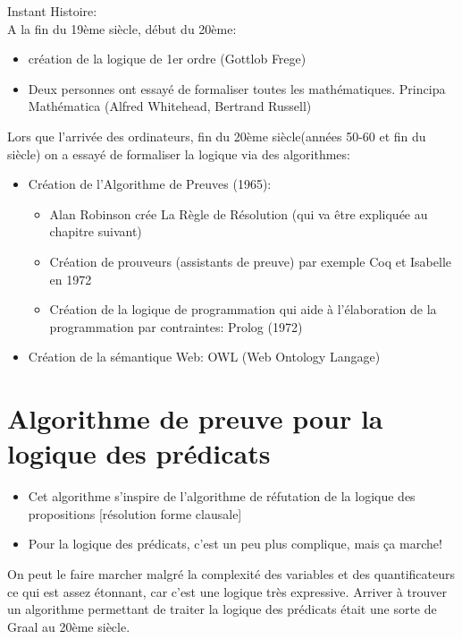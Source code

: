 \hfill {\begin{minipage}{0.90\textwidth}
\begin{small}
{\large Instant Histoire:}\\
A la fin du 19ème siècle, début du 20ème: 
\begin{itemize}
\item création de la logique de 1er ordre (Gottlob Frege)
\item Deux personnes ont essayé de formaliser toutes les mathématiques. Principa Mathématica (Alfred Whitehead, Bertrand Russell)
\end{itemize}
Lors que l'arrivée des ordinateurs, fin du 20ème siècle(années 50-60 et fin du siècle) on a essayé de formaliser la logique via des algorithmes:
\begin{itemize}
\item Création de l'Algorithme de Preuves (1965):
\begin{itemize}
\item Alan Robinson crée La Règle de Résolution (qui va être expliquée au chapitre suivant)
\item Création de prouveurs (assistants de preuve) par exemple Coq et Isabelle en 1972
\item Création de la logique de programmation qui aide à l'élaboration de la programmation par contraintes: Prolog (1972) 
\end{itemize}
\item Création de la sémantique Web: OWL (Web Ontology Langage)
\end{itemize}
\end{small}
\end{minipage}
\chapter{Algorithme de preuve pour la logique des prédicats}
\begin{itemize}
    \item Cet algorithme s'inspire de l'algorithme de réfutation de la logique des propositions [résolution forme clausale]
    \item Pour la logique des prédicats, c'est un peu plus complique, mais ça marche!
\end{itemize}
On peut le faire marcher malgré la complexité des variables et des quantificateurs ce qui est assez étonnant, car c'est une logique très expressive. 
Arriver à trouver un algorithme permettant de traiter la logique des prédicats était une sorte de Graal au 20ème siècle. 
}

